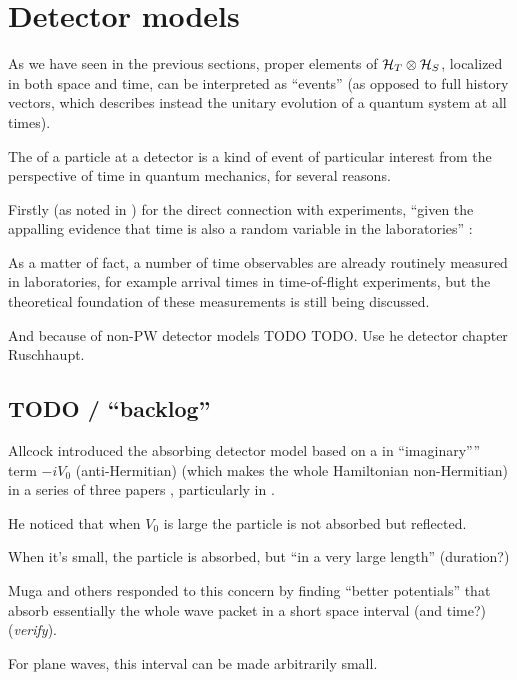 \section{Detector models}

As we have seen in the previous sections, proper elements of $\mathcal{H}_T \otimes \mathcal{H}_S$,
localized in both space and time, can be interpreted as ``events''
(as opposed to full history vectors, which describes instead the unitary evolution
of a quantum system at all times).

The  of a particle at a detector
is a kind of event
of particular interest from the perspective of time
in quantum mechanics, for several reasons.

Firstly (as noted in \cite{TQM2})
for the direct connection with experiments,
``given the appalling evidence that time is also a random variable in the laboratories''
\parencite[Sec. 4.1]{TQM2}:
\begin{displayquote}
  As a matter of fact, a number of time observables are already routinely measured in laboratories, for example arrival times in time-of-flight experiments, but the theoretical foundation of these measurements is still being discussed.
\end{displayquote}

And because of non-PW detector models TODO TODO.
Use he detector chapter Ruschhaupt.

\subsection*{TODO / ``backlog''}

Allcock introduced the absorbing detector model based on a in ``imaginary'''' term $-iV_0$
(anti-Hermitian) (which makes the whole Hamiltonian non-Hermitian) in a series of three papers
\parencite{Allcock-1, Allcock-2, Allcock-3},
particularly in \cite[sec. II-IV]{Allcock-2}.

He noticed that when $V_0$ is large the particle is not absorbed but reflected.

When it's small, the particle is absorbed, but ``in a very large length'' (duration?)

Muga and others responded to this concern by finding ``better potentials'' that absorb essentially the
whole wave packet in a short space interval (and time?)
\parencite{Muga_TOAQM, Muga_CompositeAbsPot, ComplexAbsPot} (\emph{verify}).

For plane waves, this interval can be made arbitrarily small.

